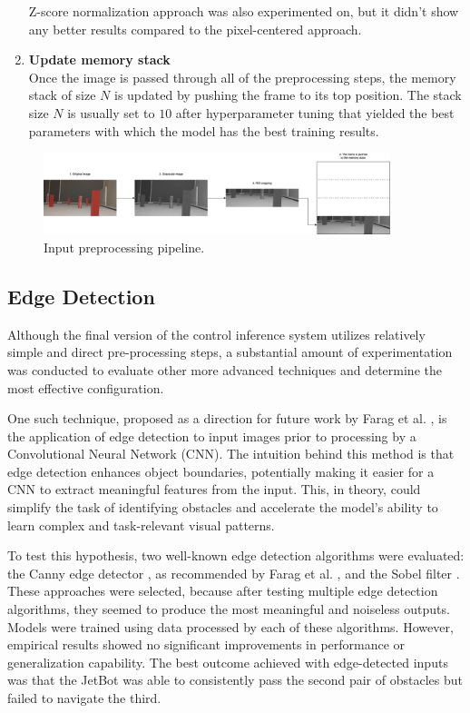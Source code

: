 \begin{enumerate}
    Z-score normalization approach was also experimented on, but it didn't show any better results compared to the pixel-centered approach.

  \item \textbf{Update memory stack} \\
    Once the image is passed through all of the preprocessing steps, the memory stack of size $N$ is updated by pushing the frame to its top position. The stack size $N$ is usually set to $10$ after hyperparameter tuning that yielded the best parameters with which the model has the best training results.
\end{enumerate}

\begin{figure}[htbp]
  \centering
  \includegraphics[width=0.9\textwidth]{Images/preprocessing.png}
  \caption{Input preprocessing pipeline.}
  \label{fig:preprocessing}
\end{figure}

\subsection{Edge Detection}
\label{sec:edge-detection}

Although the final version of the control inference system utilizes relatively simple and direct pre-processing steps, a substantial amount of experimentation was conducted to evaluate other more advanced techniques and determine the most effective configuration.

One such technique, proposed as a direction for future work by Farag et al. \autocite{8855753}, is the application of edge detection to input images prior to processing by a Convolutional Neural Network (CNN). The intuition behind this method is that edge detection enhances object boundaries, potentially making it easier for a CNN to extract meaningful features from the input. This, in theory, could simplify the task of identifying obstacles and accelerate the model’s ability to learn complex and task-relevant visual patterns.

To test this hypothesis, two well-known edge detection algorithms were evaluated: the Canny edge detector \autocite{canny1986computational}, as recommended by Farag et al. \autocite{8855753}, and the Sobel filter \autocite{sobel2014history}. These approaches were selected, because after testing multiple edge detection algorithms, they seemed to produce the most meaningful and noiseless outputs. Models were trained using data processed by each of these algorithms. However, empirical results showed no significant improvements in performance or generalization capability. The best outcome achieved with edge-detected inputs was that the JetBot was able to consistently pass the second pair of obstacles but failed to navigate the third.

